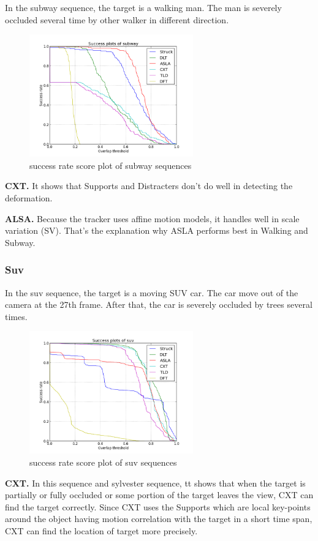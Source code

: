 \documentclass{acm_proc_article-sp}
\begin{document}
In the subway sequence, the target is a walking man. The man is severely occluded several time by other walker in different direction.

\begin{figure}[hbt]
	\centering
    \includegraphics[width=200pt]{subway}
    \caption{success rate score plot of subway sequences}
    \label{fig:subway}
\end{figure}

\textbf{CXT.} It shows that Supports and Distracters don't do well in detecting the deformation.

\textbf{ALSA.} Because the tracker uses affine motion models, it handles well in scale variation (SV). That’s the explanation why ASLA performs best in Walking and Subway. 

\subsubsection{Suv}

In the suv sequence, the target is a moving SUV car. The car move out of the camera at the 27th frame. After that, the car is severely occluded by trees several times.

\begin{figure}[hbt]
	\centering
    \includegraphics[width=200pt]{suv}
    \caption{success rate score plot of suv sequences}
    \label{fig:suv}
\end{figure}

\textbf{CXT.} In this sequence and sylvester sequence, tt shows that when the target is partially or fully occluded or some portion of the target leaves the view, CXT can find the target correctly. Since CXT uses the Supports which are local key-points around the object having motion correlation with the target in a short time span, CXT can find the location of target more precisely.
\end{document}
